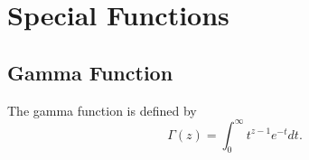 \chapter{Special Functions}

\section{Gamma Function}

\begin{definition} \label{D:gamma}
The gamma function is defined by 
\begin{equation}
  \Gamma(z) = \int_0^{\infty} t^{z-1} e^{-t} dt.
\end{equation}
\end{definition}

